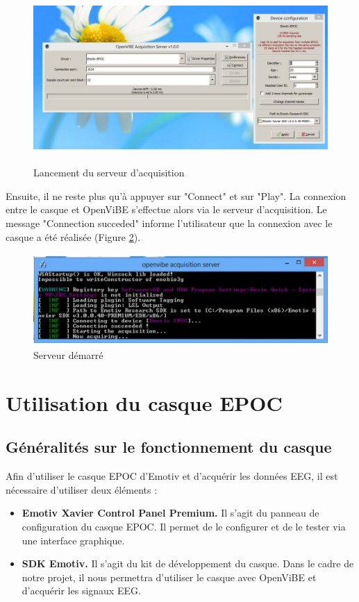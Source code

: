 \begin{figure}[h]
	\centering\includegraphics[height=6.5cm]{images/configOpenvibeEpoc.png}
	\caption{Lancement du serveur d'acquisition}
	\label{fig:acquisition}
\end{figure}

Ensuite, il ne reste plus qu'à appuyer sur "Connect" et sur "Play". La connexion entre le casque et OpenViBE s'effectue alors via le serveur d'acquisition. Le message "Connection succeded" informe l'utilisateur que la connexion avec le casque a été réalisée (Figure \ref{serveurUp}).

\begin{figure}[h]
	\centering\includegraphics[height=3.5cm]{images/serveurUp.png}
	\caption{Serveur démarré}
	\label{serveurUp}
\end{figure}

\section {Utilisation du casque EPOC}
\label{Section : 5.Utilisation du casque EPOC}

\subsection{Généralités sur le fonctionnement du casque}
\label{Subsection : 5.Généralités sur le fonctionnement du casque}
Afin d'utiliser le casque EPOC d'Emotiv et d'acquérir les données EEG, il est nécessaire d'utiliser deux éléments :
\smallbreak
\begin{itemize}
	\item \textbf{Emotiv Xavier Control Panel Premium.} Il s'agit du panneau de configuration du casque EPOC. Il permet de le configurer et de le tester via une interface graphique.
	\smallbreak
	\item \textbf{ SDK Emotiv.} Il s'agit du kit de développement du casque. Dans le cadre de notre projet, il nous permettra d'utiliser le casque avec OpenViBE et d'acquérir les signaux EEG.
\end{itemize}
	
